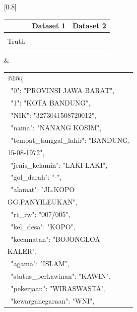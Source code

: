 \documentclass[uplatex, twocolumn,10pt]{jsarticle}
\begin{document}
\begin{table}[hbtp]
    \centering
    \small
    \scalebox{1.0}[0.8]{
        \begin{tabular}{|l|l|l|}
            \hline
                                           & Dataset 1                      & Dataset 2                      \\ 
            \hline
            \begin{tabular}{@{}l@{}}Ground\\Truth\end{tabular}  & \begin{tabular}{p{6cm}}{@{}l@{}}\{\\~"0": "PROVINSI JAWA BARAT", \\~"1": "KOTA BANDUNG",\\~"NIK": "3273041508720012", \\~"nama": "NANANG KOSIM", \\~"tempat\_tanggal\_lahir": "BANDUNG,\\15-08-1972",\\~"jenis\_kelamin": "LAKI-LAKI",\\~"gol\_darah": "-", \\~"alamat": "JL.KOPO\\GG.PANYILEUKAN", \\~"rt\_rw": "007/005", \\~"kel\_desa": "KOPO", \\~"kecamatan": "BOJONGLOA\\KALER", \\~"agama": "ISLAM",\\~"status\_perkawinan": "KAWIN", \\~"pekerjaan": "WIRASWASTA", \\~"kewarganegaraan": "WNI",
\end{tabular}}
\end{table}
\end{document}
